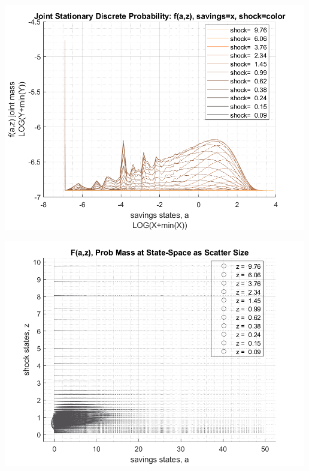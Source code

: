 \documentclass[
]{book}
\begin{document}
\includegraphics[width=5.20833in,height=\textheight]{img/fx_ds_az_cts_vec_images/figure_15.png}

\includegraphics[width=5.20833in,height=\textheight]{img/fx_ds_az_cts_vec_images/figure_16.png}
\end{document}
